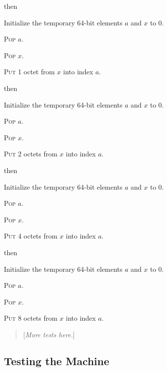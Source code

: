 \documentclass[a4paper,12pt]{article}
\newcommand{\num}[1]{\texttt{#1}}
\newcommand{\hex}[1]{\num{#1}_{\textup{\tiny 16}}}
\newcommand{\proc}[1]{\textsc{#1}}
\newcommand{\comment}[1]{\begin{quote}[\textit{#1}]\end{quote}}
\newcommand{\op}[1]{$#1$}
\newcommand{\STOREB}    [1]{\op{\hex{14}}}
\newcommand{\STORES}    [1]{\op{\hex{15}}}
\newcommand{\STOREI}    [1]{\op{\hex{16}}}
\newcommand{\STOREL}    [1]{\op{\hex{17}}}
\begin{document}
\begin{stepnumbers}[start=3]
\begin{description}
\begin{stepnumbers}
    \end{stepnumbers}
  \item[\STOREB{}] then
    \begin{stepnumbers}
    \item Initialize the temporary 64-bit elements $a$ and $x$ to 0.
    \item \proc{Pop} $a$.
    \item \proc{Pop} $x$.
    \item \proc{Put} 1 octet from $x$ into index $a$.
    \end{stepnumbers}
  \item[\STORES{}] then
    \begin{stepnumbers}
    \item Initialize the temporary 64-bit elements $a$ and $x$ to 0.
    \item \proc{Pop} $a$.
    \item \proc{Pop} $x$.
    \item \proc{Put} 2 octets from $x$ into index $a$.
    \end{stepnumbers}
  \item[\STOREI{}] then
    \begin{stepnumbers}
    \item Initialize the temporary 64-bit elements $a$ and $x$ to 0.
    \item \proc{Pop} $a$.
    \item \proc{Pop} $x$.
    \item \proc{Put} 4 octets from $x$ into index $a$.
    \end{stepnumbers}
  \item[\STOREL{}] then
    \begin{stepnumbers}
    \item Initialize the temporary 64-bit elements $a$ and $x$ to 0.
    \item \proc{Pop} $a$.
    \item \proc{Pop} $x$.
    \item \proc{Put} 8 octets from $x$ into index $a$.
    \end{stepnumbers}
  \end{description}
\end{stepnumbers}

\comment{More tests here.}

\subsection{Testing the Machine}
\end{document}
